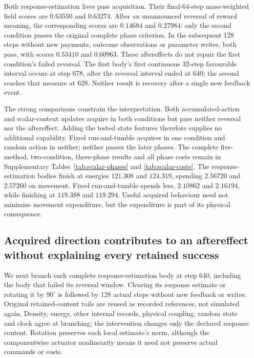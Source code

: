 Both response-estimation lives pass acquisition. Their final-64-step mass-weighted field scores are $0.63550$ and $0.63274$. After an unannounced reversal of reward meaning, the corresponding scores are $0.14684$ and $0.27984$: only the second condition passes the original complete phase criterion. In the subsequent 128 steps without new payments, outcome observations or parameter writes, both pass, with scores $0.53410$ and $0.60963$. These aftereffects do not repair the first condition's failed reversal. The first body's first continuous 32-step favourable interval occurs at step 678, after the reversal interval ended at 640; the second reaches that measure at 628. Neither result is recovery after a single new feedback event.

The strong comparisons constrain the interpretation. Both accumulated-action and scalar-context updates acquire in both conditions but pass neither reversal nor the aftereffect. Adding the tested state features therefore supplies no additional capability. Fixed run-and-tumble acquires in one condition and random action in neither; neither passes the later phases. The complete five-method, two-condition, three-phase results and all phase costs remain in Supplementary Tables~\ref{tab:scalar-phases} and \ref{tab:scalar-costs}. The response-estimation bodies finish at energies $121.308$ and $124.319$, spending $2.56720$ and $2.57260$ on movement. Fixed run-and-tumble spends less, $2.10862$ and $2.16194$, while finishing at $119.388$ and $119.294$. Useful acquired behaviour need not minimize movement expenditure, but the expenditure is part of its physical consequence.

\subsection*{Acquired direction contributes to an aftereffect without explaining every retained success}

We next branch each complete response-estimation body at step 640, including the body that failed its reversal window. Clearing its response estimate or rotating it by $90^\circ$ is followed by 128 actual steps without new feedback or writes. Original retained-content tails are reused as recorded references, not simulated again. Density, energy, other internal records, physical coupling, random state and clock agree at branching; the intervention changes only the declared response content. Rotation preserves each local estimate's norm, although the componentwise actuator nonlinearity means it need not preserve actual commands or costs.

